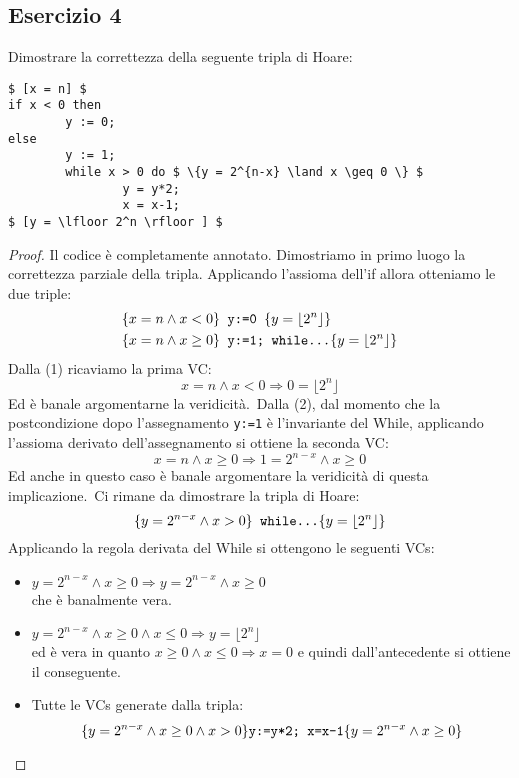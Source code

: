 \subsection{Esercizio 4}
Dimostrare la correttezza della seguente tripla di Hoare:
\begin{lstlisting}[mathescape, numberfirstline=false, frame=single]
$ [x = n] $
if x < 0 then
        y := 0;
else
        y := 1;
        while x > 0 do $ \{y = 2^{n-x} \land x \geq 0 \} $
                y = y*2;
                x = x-1;
$ [y = \lfloor 2^n \rfloor ] $
\end{lstlisting}

\begin{proof}
Il codice è completamente annotato. Dimostriamo in primo luogo la correttezza parziale della tripla. Applicando l'assioma dell'if allora otteniamo le due triple:
\begin{align}
& \{x=n \land x<0 \} \text{\texttt{ y:=0 }} \{y= \lfloor 2^n \rfloor \} \\
& \{x=n \land x \geq 0 \} \text{\texttt{ y:=1; while}} \texttt{\dots } \{ y= \lfloor 2^n \rfloor \}
\end{align}
Dalla (1) ricaviamo la prima VC:
\[ x = n \land x<0 \Rightarrow 0 = \lfloor 2^n \rfloor \]
Ed è banale argomentarne la veridicità.\
Dalla (2), dal momento che la postcondizione dopo l'assegnamento \texttt{y:=1} è l'invariante del While, applicando l'assioma derivato dell'assegnamento si ottiene la seconda VC:
\[ x=n \land x \geq 0 \Rightarrow 1 = 2^{n-x} \land x \geq 0 \]
Ed anche in questo caso è banale argomentare la veridicità di questa implicazione.\
Ci rimane da dimostrare la tripla di Hoare:
\[ \{ y=2^{n-x} \land x>0 \} \text{\texttt{ while}} \texttt{\dots } \{y= \lfloor 2^n \rfloor \} \]
Applicando la regola derivata del While si ottengono le seguenti VCs:
\begin{itemize}
  \item $ y=2^{n-x} \land x \geq 0 
        \Rightarrow y=2^{n-x} \land x \geq 0 $ \\
        che è banalmente vera.
  \item $ y=2^{n-x} \land x \geq 0 \land x \leq 0
        \Rightarrow y = \lfloor 2^n \rfloor $ \\
        ed è vera in quanto
        $ x \geq 0 \land x \leq 0\Rightarrow x = 0 $
        e quindi dall'antecedente si ottiene il conseguente.
  \item Tutte le VCs generate dalla tripla:
        \[ \{y=2^{n-x} \land x \geq 0 \land x>0 \}
        \text{\texttt{y:=y*2; x=x-1}}
        \{y=2^{n-x} \land x \geq 0 \} \]

\end{itemize}
\end{proof}

